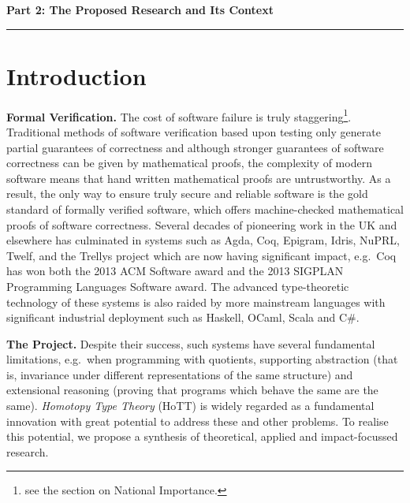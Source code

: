 \documentclass[a4paper,11pt]{article}
\newcommand{\eg}{{e.g.}\ }
\begin{document}
\newpage
\noindent
{\bf \Large Part 2: The Proposed Research and Its Context}

\vspace*{-0.23in}

\begin{center}
\rule{170mm}{.5mm}
\end{center}

\vspace*{-0.4in}

\section{Introduction}\label{sec:intro}

\vspace*{-0.1in}

{\bf Formal Verification.} The cost of software failure is truly
staggering\footnote{see the section on National
  Importance.}. Traditional methods of software verification based
upon testing only generate partial guarantees of correctness and
although stronger
guarantees of software correctness can be given by mathematical
proofs, the complexity of modern software means that hand written
mathematical proofs are untrustworthy. As a result, the only way to
ensure truly secure and reliable software is the gold standard of
formally verified software, which offers machine-checked mathematical
proofs of software correctness. Several decades of pioneering work in
the UK and elsewhere has culminated in systems 
such as Agda, Coq, Epigram, Idris, NuPRL, Twelf, and
the Trellys project which are now having significant impact,
\eg Coq has won both the 2013 ACM Software award and the 2013 SIGPLAN
Programming Languages Software award. The advanced type-theoretic
technology of these systems is also raided by more mainstream languages
with significant industrial deployment such as Haskell, OCaml, Scala
and C\#.


{\bf The Project.} Despite their success, such systems have several
fundamental limitations, \eg when programming with quotients,
supporting abstraction (that is, invariance under different
representations of the same structure) and extensional reasoning
(proving that programs which behave the same are the same).  {\em
  Homotopy Type Theory} (HoTT) is widely regarded as a fundamental
innovation with great potential to address these and other problems.
To realise this potential, we propose a synthesis of
theoretical, applied and impact-focussed research.
\end{document}

